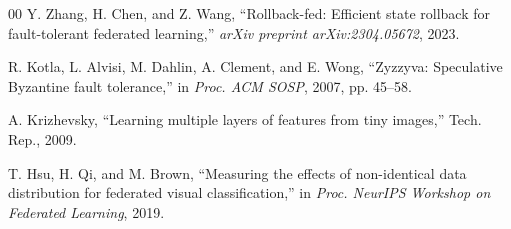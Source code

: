 \documentclass[conference]{IEEEtran}
\begin{document}
\begin{thebibliography}{00}
 Y. Zhang, H. Chen, and Z. Wang, ``Rollback-fed: Efficient state rollback for fault-tolerant federated learning,'' \textit{arXiv preprint arXiv:2304.05672}, 2023.

 R. Kotla, L. Alvisi, M. Dahlin, A. Clement, and E. Wong, ``Zyzzyva: Speculative Byzantine fault tolerance,'' in \textit{Proc. ACM SOSP}, 2007, pp. 45--58.

 A. Krizhevsky, ``Learning multiple layers of features from tiny images,'' Tech. Rep., 2009.

 T. Hsu, H. Qi, and M. Brown, ``Measuring the effects of non-identical data distribution for federated visual classification,'' in \textit{Proc. NeurIPS Workshop on Federated Learning}, 2019.


\end{thebibliography}
\end{document}
